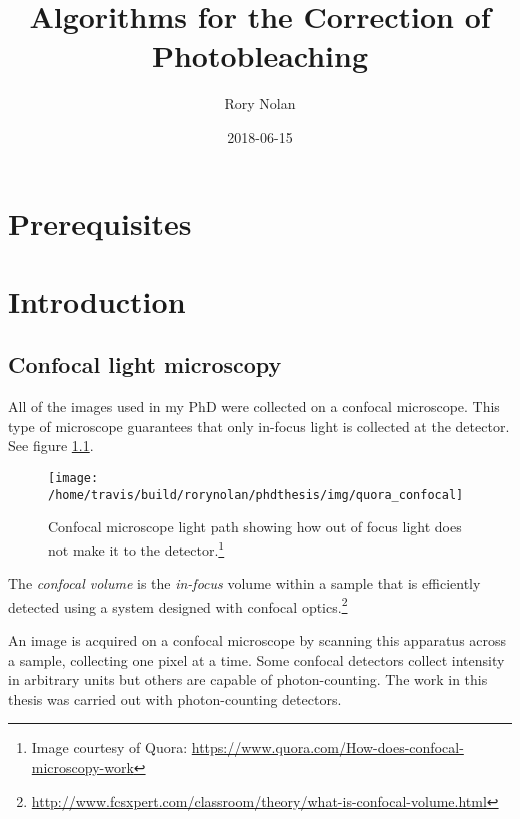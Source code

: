 \documentclass[12pt,]{book}
\title{Algorithms for the Correction of Photobleaching}
\author{Rory Nolan}
\date{2018-06-15}
\let\rmarkdownfootnote\footnote%
\def\footnote{\protect\rmarkdownfootnote}
\theoremstyle{definition}
\theoremstyle{definition}
\theoremstyle{definition}
\theoremstyle{remark}
\let\BeginKnitrBlock\begin \let\EndKnitrBlock\end
\begin{document}
\maketitle

{
\hypersetup{linkcolor=blue}
\setcounter{tocdepth}{1}
\tableofcontents
}
\chapter*{Prerequisites}\label{prerequisites}

\chapter{Introduction}\label{intro}

\section{Confocal light microscopy}\label{confocal-light-microscopy}

All of the images used in my PhD were collected on a confocal
microscope. This type of microscope guarantees that only in-focus light
is collected at the detector. See figure \ref{fig:confocal}.





\begin{figure}

\texttt{[image: /home/travis/build/rorynolan/phdthesis/img/quora\_confocal]} \hfill{}

\caption{Confocal microscope light path showing how out of
focus light does not make it to the detector.\footnote{Image courtesy of
  Quora: \url{https://www.quora.com/How-does-confocal-microscopy-work}}}\label{fig:confocal}
\end{figure}

\BeginKnitrBlock{definition}
\protect\hypertarget{def:unnamed-chunk-1}{}{\label{def:unnamed-chunk-1} }The
\emph{confocal volume} is the \emph{in-focus} volume within a sample
that is efficiently detected using a system designed with confocal
optics.\footnote{\url{http://www.fcsxpert.com/classroom/theory/what-is-confocal-volume.html}}
\EndKnitrBlock{definition}

An image is acquired on a confocal microscope by scanning this apparatus
across a sample, collecting one pixel at a time. Some confocal detectors
collect intensity in arbitrary units but others are capable of
photon-counting. The work in this thesis was carried out with
photon-counting detectors.
\end{document}

